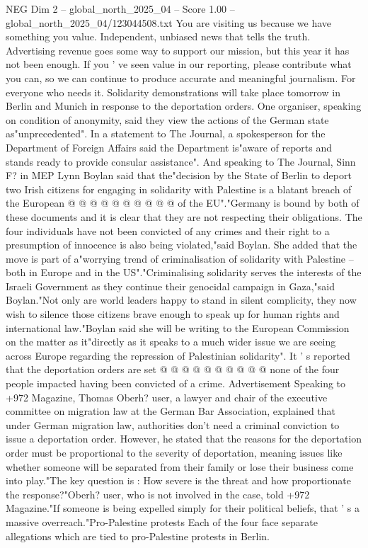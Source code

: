\begin{textsample}{NEG Dim 2 – global\_north\_2025\_04 – Score 1.00 – global\_north\_2025\_04/123044508.txt}  \label{ex:f2_neg_122}
You are visiting us because we have something you value.
Independent, unbiased news that tells the truth.
Advertising revenue goes some way to support our mission, but this year it has not been enough.
If you ' ve seen value in our reporting, please contribute what you can, so we can continue to produce accurate and meaningful journalism.
For everyone who needs it.
Solidarity demonstrations will take place tomorrow in Berlin and Munich in response to the deportation orders.
One organiser, speaking on condition of anonymity, said they view the actions of the German state as"unprecedented".
In a statement to The Journal, a spokesperson for the Department of Foreign Affairs said the Department is"aware of reports and stands ready to provide consular assistance".
And speaking to The Journal, Sinn F? in MEP Lynn Boylan said that the"decision by the State of Berlin to deport two Irish citizens for engaging in solidarity with Palestine is a blatant breach of the European @ @ @ @ @ @ @ @ @ @ of the EU"."Germany is bound by both of these documents and it is clear that they are not respecting their obligations.
The four individuals have not been convicted of any crimes and their right to a presumption of innocence is also being violated,"said Boylan.
She added that the move is part of a"worrying trend of criminalisation of solidarity with Palestine -- both in Europe and in the US"."Criminalising solidarity serves the interests of the Israeli Government as they continue their genocidal campaign in Gaza,"said Boylan."Not only are world leaders happy to stand in silent complicity, they now wish to silence those citizens brave enough to speak up for human rights and international law."Boylan said she will be writing to the European Commission on the matter as it"directly as it speaks to a much wider issue we are seeing across Europe regarding the repression of Palestinian solidarity".
It ' s reported that the deportation orders are set @ @ @ @ @ @ @ @ @ @ none of the four people impacted having been convicted of a crime.
Advertisement Speaking to +972 Magazine, Thomas Oberh? user, a lawyer and chair of the executive committee on migration law at the German Bar Association, explained that under German migration law, authorities don't need a criminal conviction to issue a deportation order.
However, he stated that the reasons for the deportation order must be proportional to the severity of deportation, meaning issues like whether someone will be separated from their family or lose their business come into play."The key question is : How severe is the threat and how proportionate the response?"Oberh? user, who is not involved in the case, told +972 Magazine."If someone is being expelled simply for their political beliefs, that ' s a massive overreach."Pro-Palestine protests Each of the four face separate allegations which are tied to pro-Palestine protests in Berlin.

\end{textsample}
